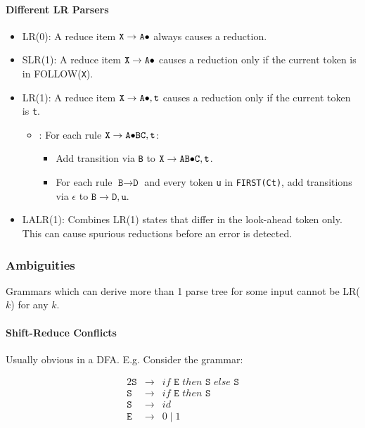 \documentclass[twocolumn,english]{article}
\let\emph\relax
\begin{document}
\paragraph{Different LR Parsers}
\begin{itemize}
\item LR(0): A reduce item $\texttt{X}\rightarrow\texttt{A\ensuremath{\bullet}}$
always causes a reduction. 
\item SLR(1): A reduce item $\texttt{X}\rightarrow\texttt{A\ensuremath{\bullet}}$
causes a reduction only if the current token is in FOLLOW(\texttt{X}). 
\item LR(1): A reduce item $\texttt{X}\rightarrow\texttt{A\ensuremath{\bullet}},\texttt{t}$
causes a reduction only if the current token is \texttt{t}. 

\begin{itemize}
\item \emph{FA Transitions}: For each rule $\texttt{X}\rightarrow\texttt{A\ensuremath{\bullet}BC},\texttt{t}$:

\begin{itemize}
\item Add transition via \texttt{B} to $\texttt{X}\rightarrow\texttt{AB\ensuremath{\bullet}C},\texttt{t}$.
\item For each rule $\texttt{B}\rightarrow\texttt{D}$ and every token \texttt{u}
in \texttt{FIRST(Ct)}, add transitions via $\epsilon$ to $\texttt{B}\rightarrow\texttt{D},\texttt{u}$.
\end{itemize}
\end{itemize}
\item LALR(1): Combines LR(1) states that differ in the look-ahead token
only. This can cause spurious reductions before an error is detected. 
\end{itemize}

\subsubsection{Ambiguities}

Grammars which can derive more than 1 parse tree for some input cannot
be LR($k$) for any $k$.


\paragraph{Shift-Reduce Conflicts}

Usually obvious in a DFA. E.g. Consider the grammar:

\begin{alignat*}{2}
\texttt{S} & \rightarrow & if\texttt{ E }then\texttt{ S }else\texttt{ S}\\
\texttt{S} & \rightarrow & if\texttt{ E }then\texttt{ S}\\
\texttt{S} & \rightarrow & id\\
\texttt{E} & \rightarrow & 0\mid1
\end{alignat*}
\end{document}
